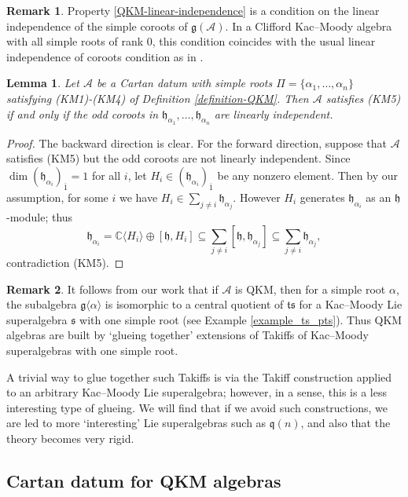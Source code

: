 \documentclass[12pt, a4paper, reqno]{amsart}
\def\C{\mathbb{C}}
\def\AA{\mathcal{A}}
\def\q{\mathfrak{q}}
\def\g{\mathfrak{g}}
\def\h{\mathfrak{h}}
\def\s{\mathfrak{s}}
\def\ol{\overline}
\newtheorem{lemma}{Lemma}
\theoremstyle{definition}
\theoremstyle{definition}
\newtheorem{remark}{Remark}
\theoremstyle{definition}
\numberwithin{theorem}{section}
\numberwithin{lemma}{section}
\numberwithin{remark}{section}
\numberwithin{definition}{section}
\numberwithin{corollary}{section}
\numberwithin{proposition}{section}
\numberwithin{example}{section}
\begin{document}
	\begin{remark}
		Property \ref{QKM-linear-independence} is a condition on the linear independence of the simple coroots of \(\mathfrak{g}(\mathcal{A})\). In a Clifford Kac--Moody algebra with all simple roots of rank \(0\), this condition coincides with the usual linear independence of coroots condition as in \cite{K}.
	\end{remark}
	
	\begin{lemma}
		Let $\AA$ be a Cartan datum with simple roots $\Pi=\{\alpha_1,\dots,\alpha_n\}$ satisfying (KM1)-(KM4) of Definition \ref{definition-QKM}.  Then $\AA$ satisfies (KM5) if and only if the odd coroots in $\h_{\alpha_1},\dots,\h_{\alpha_n}$ are linearly independent.
	\end{lemma}
	
	\begin{proof}
		The backward direction is clear.  For the forward direction, suppose that $\AA$ satisfies (KM5) but the odd coroots are not linearly independent.  Since $\dim(\h_{\alpha_i})_{\ol{1}}=1$ for all $i$, let $H_i\in(\h_{\alpha_i})_{\ol{1}}$ be any nonzero element. Then by our assumption, for some $i$ we have $H_i\in\sum_{j\neq i}\h_{\alpha_j}$.  However $H_i$ generates $\h_{\alpha_i}$ as an $\h$-module; thus 
		\[
		\h_{\alpha_i}=\C\langle H_i\rangle\oplus[\h,H_i]\subseteq\sum\limits_{j\neq i}[\h,\h_{\alpha_j}]\subseteq\sum_{j\neq i}\h_{\alpha_j},
		\]
		contradiction (KM5).
	\end{proof}

	\begin{remark}
		It follows from our work that if $\AA$ is QKM, then for a simple root $\alpha$, the subalgebra $\g\langle\alpha\rangle$ is isomorphic to a central quotient of $\mathfrak{t}\s$ for a Kac--Moody Lie superalgebra $\mathfrak{s}$ with one simple root (see Example \ref{example_ts_pts}).  Thus QKM algebras are built by `glueing together' extensions of Takiffs of Kac--Moody superalgebras with one simple root.
		
		A trivial way to glue together such Takiffs is via the Takiff construction applied to an arbitrary Kac--Moody Lie superalgebra; however, in a sense, this is a less interesting type of glueing.  We will find that if we avoid such constructions, we are led to more `interesting' Lie superalgebras such as $\q(n)$, and also that the theory becomes very rigid.
	\end{remark}
	
	\subsection{Cartan datum for QKM algebras}\label{section-notation-QKM}
	
\end{document}
